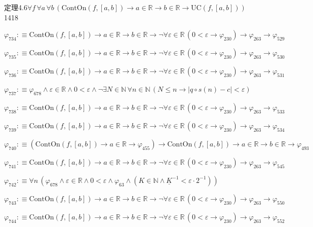 \begin{fullproof}{定理4.6}{$\forall f\,\forall a\,\forall b\,(\mathrm{ContOn}(f,[a,b]) \to a \in \mathbb{R} \to b \in \mathbb{R} \to \mathrm{UC}(f,[a,b]))$}{1418}
\begin{abbrevlist}
\item $\varphi_{734} :\equiv \mathrm{ContOn}(f,[a,b]) \to a \in \mathbb{R} \to b \in \mathbb{R} \to \neg \forall \varepsilon \in \mathbb{R}\,(0 < \varepsilon \to \varphi_{230}) \to \varphi_{263} \to \varphi_{529}$
\item $\varphi_{735} :\equiv \mathrm{ContOn}(f,[a,b]) \to a \in \mathbb{R} \to b \in \mathbb{R} \to \neg \forall \varepsilon \in \mathbb{R}\,(0 < \varepsilon \to \varphi_{230}) \to \varphi_{263} \to \varphi_{530}$
\item $\varphi_{736} :\equiv \mathrm{ContOn}(f,[a,b]) \to a \in \mathbb{R} \to b \in \mathbb{R} \to \neg \forall \varepsilon \in \mathbb{R}\,(0 < \varepsilon \to \varphi_{230}) \to \varphi_{263} \to \varphi_{531}$
\item $\varphi_{737} :\equiv \varphi_{678} \land \varepsilon \in \mathbb{R} \land 0 < \varepsilon \land \neg \exists N \in \mathbb{N}\,\forall n \in \mathbb{N}\,(N \leq n \to \lvert q \circ s(n) - c \rvert < \varepsilon)$
\item $\varphi_{738} :\equiv \mathrm{ContOn}(f,[a,b]) \to a \in \mathbb{R} \to b \in \mathbb{R} \to \neg \forall \varepsilon \in \mathbb{R}\,(0 < \varepsilon \to \varphi_{230}) \to \varphi_{263} \to \varphi_{533}$
\item $\varphi_{739} :\equiv \mathrm{ContOn}(f,[a,b]) \to a \in \mathbb{R} \to b \in \mathbb{R} \to \neg \forall \varepsilon \in \mathbb{R}\,(0 < \varepsilon \to \varphi_{230}) \to \varphi_{263} \to \varphi_{534}$
\item $\varphi_{740} :\equiv (\mathrm{ContOn}(f,[a,b]) \to a \in \mathbb{R} \to \varphi_{455}) \to \mathrm{ContOn}(f,[a,b]) \to a \in \mathbb{R} \to b \in \mathbb{R} \to \varphi_{493}$
\item $\varphi_{741} :\equiv \mathrm{ContOn}(f,[a,b]) \to a \in \mathbb{R} \to b \in \mathbb{R} \to \neg \forall \varepsilon \in \mathbb{R}\,(0 < \varepsilon \to \varphi_{230}) \to \varphi_{263} \to \varphi_{545}$
\item $\varphi_{742} :\equiv \forall n\,(\varphi_{678} \land \varepsilon \in \mathbb{R} \land 0 < \varepsilon \land \varphi_{63} \land (K \in \mathbb{N} \land \underline{K}^{-1} < \varepsilon \cdot 2^{-1}))$
\item $\varphi_{743} :\equiv \mathrm{ContOn}(f,[a,b]) \to a \in \mathbb{R} \to b \in \mathbb{R} \to \neg \forall \varepsilon \in \mathbb{R}\,(0 < \varepsilon \to \varphi_{230}) \to \varphi_{263} \to \varphi_{550}$
\item $\varphi_{744} :\equiv \mathrm{ContOn}(f,[a,b]) \to a \in \mathbb{R} \to b \in \mathbb{R} \to \neg \forall \varepsilon \in \mathbb{R}\,(0 < \varepsilon \to \varphi_{230}) \to \varphi_{263} \to \varphi_{552}$

\end{abbrevlist}
\end{fullproof}
